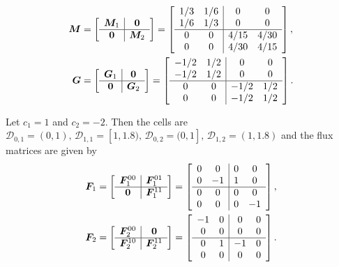 \begin{align*}
	\boldsymbol M &= \left[\begin{array}{c|c} \boldsymbol M_1 & \boldsymbol 0 \\\hline \boldsymbol 0 & \boldsymbol M_2 \end{array}\right] = \left[\begin{array}{cc|cc} 1/3 & 1/6 & 0 & 0 \\ 1/6 & 1/3 & 0 & 0 \\\hline 0 & 0 & 4/15 & 4/30 \\ 0 & 0 & 4/30 & 4/15 \end{array}\right],
	\\ \boldsymbol G &= \left[\begin{array}{c|c} \boldsymbol G_1 & \boldsymbol 0 \\ \hline \boldsymbol 0 & \boldsymbol G_2 \end{array}\right] = \left[\begin{array}{cc|cc} -1/2 & 1/2 & 0 & 0 \\ -1/2 & 1/2 & 0 & 0 \\\hline 0 & 0 & -1/2 & 1/2 \\ 0 & 0 & -1/2 & 1/2 \end{array}\right] .
\end{align*}

Let \(c_1=1\) and \(c_2=-2\). Then the cells are \(\mathcal D_{0,1} = (0,1),\,\mathcal D_{1,1}=[1,1.8),\, \mathcal D_{0,2}=(0,1],\, \mathcal D_{1,2}=(1,1.8)\) and the flux matrices are given by 
\begin{align*}
	\boldsymbol F_1 &= \left[\begin{array}{c|c} \boldsymbol F_1^{00} & \boldsymbol F_1^{01} \\\hline \boldsymbol 0 & \boldsymbol F_1^{11} \end{array}\right] = \left[\begin{array}{cc|cc} 0 & 0 & 0 & 0 \\ 0 & -1 & 1 & 0 \\\hline 0 & 0 & 0 & 0 \\ 0 & 0 & 0 & -1 \end{array}\right],
	\\\boldsymbol F_2 &= \left[\begin{array}{c|c} \boldsymbol F_2^{00} & \boldsymbol 0 \\\hline \boldsymbol  F_2^{10} & \boldsymbol F_2^{11} \end{array}\right] = \left[\begin{array}{cc|cc} -1 & 0 & 0 & 0 \\ 0 & 0 & 0 & 0 \\\hline 0 & 1 & -1 & 0 \\ 0 & 0 & 0 & 0 \end{array}\right].
\end{align*}

